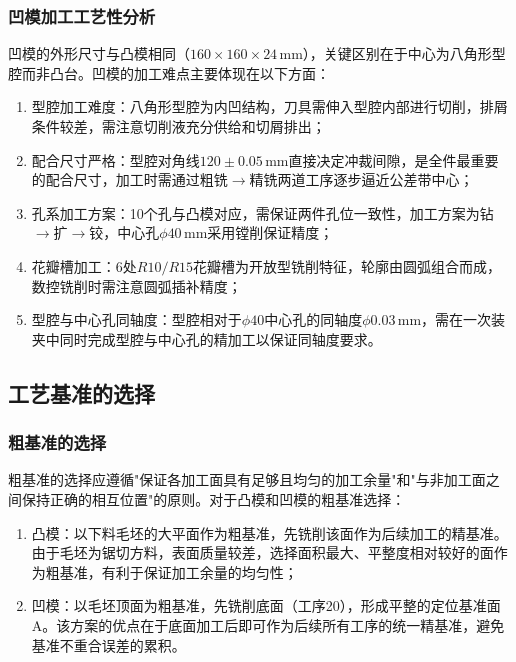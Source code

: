 \documentclass{xautCADreport}
\begin{document}
\subsubsection{凹模加工工艺性分析}

凹模的外形尺寸与凸模相同（$160\times160\times24\,\mathrm{mm}$），关键区别在于中心为八角形型腔而非凸台。凹模的加工难点主要体现在以下方面：

\begin{enumerate}
  \item 型腔加工难度：八角形型腔为内凹结构，刀具需伸入型腔内部进行切削，排屑条件较差，需注意切削液充分供给和切屑排出；
  \item 配合尺寸严格：型腔对角线$120\pm0.05\,\mathrm{mm}$直接决定冲裁间隙，是全件最重要的配合尺寸，加工时需通过粗铣$\to$精铣两道工序逐步逼近公差带中心；
  \item 孔系加工方案：10个孔与凸模对应，需保证两件孔位一致性，加工方案为钻$\to$扩$\to$铰，中心孔$\phi40\,\mathrm{mm}$采用镗削保证精度；
  \item 花瓣槽加工：6处$R10/R15$花瓣槽为开放型铣削特征，轮廓由圆弧组合而成，数控铣削时需注意圆弧插补精度；
  \item 型腔与中心孔同轴度：型腔相对于$\phi40$中心孔的同轴度$\phi0.03\,\mathrm{mm}$，需在一次装夹中同时完成型腔与中心孔的精加工以保证同轴度要求。
\end{enumerate}

\subsection{工艺基准的选择}

\subsubsection{粗基准的选择}

粗基准的选择应遵循"保证各加工面具有足够且均匀的加工余量"和"与非加工面之间保持正确的相互位置"的原则。对于凸模和凹模的粗基准选择：

\begin{enumerate}
  \item 凸模：以下料毛坯的大平面作为粗基准，先铣削该面作为后续加工的精基准。由于毛坯为锯切方料，表面质量较差，选择面积最大、平整度相对较好的面作为粗基准，有利于保证加工余量的均匀性；
  \item 凹模：以毛坯顶面为粗基准，先铣削底面（工序20），形成平整的定位基准面A。该方案的优点在于底面加工后即可作为后续所有工序的统一精基准，避免基准不重合误差的累积。
\end{enumerate}
\end{document}

